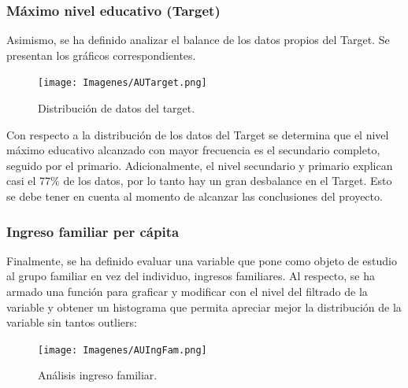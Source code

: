 \documentclass[a4paper]{article}
\begin{document}
            \subsubsection{Máximo nivel educativo (Target)}
            
            Asimismo, se ha definido analizar el balance de los datos propios del Target. Se presentan los gráficos correspondientes.
            
            \begin{figure}[H]
                \centering
                \texttt{[image: Imagenes/AUTarget.png]} 
                \caption{Distribución de datos del target.}
                \label{AU Target}
            \end{figure}
           
            Con respecto a la distribución de los datos del Target se determina que el nivel máximo educativo alcanzado con mayor frecuencia es el secundario completo, seguido por el primario. Adicionalmente, el nivel secundario y primario explican casi el 77\% de los datos, por lo tanto hay un gran desbalance en el Target. Esto se debe tener en cuenta al momento de alcanzar las conclusiones del proyecto.
           
           \subsubsection{Ingreso familiar per cápita}
           
            Finalmente, se ha definido evaluar una variable que pone como objeto de estudio al grupo familiar en vez del individuo, ingresos familiares. Al respecto, se ha armado una función para graficar y modificar con el nivel del filtrado de la variable y obtener un histograma que permita apreciar mejor la distribución de la variable sin tantos outliers:
           
            \begin{figure}[H]
                \centering
                \texttt{[image: Imagenes/AUIngFam.png]}
                \caption{Análisis ingreso familiar.}
                \label{AU Family income}
            \end{figure}
           
           
 
\end{document}
